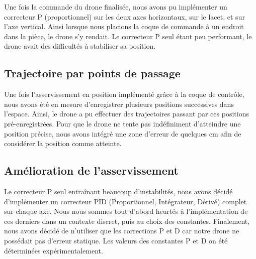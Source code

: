            Une fois la commande du drone finalisée, nous avons pu implémenter un correcteur P (proportionnel) sur les deux axes horizontaux, sur le lacet, et sur l'axe vertical. Ainsi lorsque nous placions la coque de commande à un endroit dans la pièce, le drone s'y rendait. Le correcteur P seul étant peu performant, le drone avait des difficultés à stabiliser sa position.

        \subsection{Trajectoire par points de passage}
            Une fois l'asservissement en position implémenté grâce à la coque de contrôle, nous avons été en mesure d'enregistrer plusieurs positions successives dans l'espace. Ainsi, le drone a pu effectuer des trajectoires passant par ces positions pré-enregistrées. Pour que le drone ne tente pas indéfiniment d'atteindre une position précise, nous avons intégré une zone d'erreur de quelques cm afin de considérer la position comme atteinte.

        \subsection{Amélioration de l'asservissement}
            Le correcteur P seul entraînant beaucoup d'instabilités, nous avons décidé d'implémenter un correcteur PID (Proportionnel, Intégrateur, Dérivé) complet sur chaque axe. Nous nous sommes tout d'abord heurtés à l'implémentation de ces derniers dans un contexte discret, puis au choix des constantes. Finalement, nous avons décidé de n'utiliser que les corrections P et D car notre drone ne possédait pas d'erreur statique. Les valeurs des constantes P et D on été déterminées expérimentalement.
